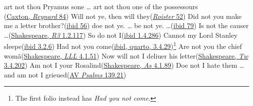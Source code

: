 \ea \label{ex:11-02}
\ea
art not thou Pryamus sone {\dots} art not thou one of the possessours\\\hfill(\href{https://archive.org/details/TheHistoryOfReynardTheFoxArber/page/n113/mode/2up?q=%22thou+Pryamus+sone%22&view=theater}{Caxton, \textit{Reynard} 84})
\ex
Will not ye, then will they\hfill(\href{https://archive.org/details/roisterdoister00udalgoog/page/n58/mode/2up?view=theater&q=%22will+not+ye%22}{\textit{Roister} 52})
\ex
Did not you make me a letter brother?\hfill(\href{https://archive.org/details/roisterdoister00udalgoog/page/n62/mode/2up?view=theater&q=%22make+me+a+letter%22}{ibid 56}) %
\ex
doe not ye. {\dots} be not ye. {\dots}\hfill(\href{https://archive.org/details/roisterdoister00udalgoog/page/n84/mode/2up?view=theater&q=%22doe+not+ye%22}{ibid 79})
\ex
Is not the causer {\dots}\hfill(\href{https://internetshakespeare.uvic.ca/doc/R3_F1/scene/1.2/index.html#tln-300}{Shakespeare, \textit{R3} 1.2.117})
\ex
So do not I\hfill(\href{https://internetshakespeare.uvic.ca/doc/R3_F1/scene/1.4/index.html#tln-1110}{ibid 1.4.286})
\ex
Cannot my Lord Stanley sleepe\hfill(\href{https://internetshakespeare.uvic.ca/doc/R3_F1/scene/3.2/index.html#tln-1800}{ibid 3.2.6}) %
\ex
Had not you come\hfill(\href{https://internetshakespeare.uvic.ca/doc/R3_Q1/complete/index.html#tln-1990}{ibid, quarto, 3.4.29})\footnote{The first folio instead has \textit{Had you not come}. \eds} %
\ex
Are not you the chief womã\hfill(\href{https://internetshakespeare.uvic.ca/doc/LLL_F1/scene/4.1/index.html#tln-1025}{Shakespeare, \textit{LLL} 4.1.51}) %
\ex
Now will not I deliuer his letter\hfill(\href{https://internetshakespeare.uvic.ca/doc/TN_F1/scene/3.4/index.html#tln-1700}{Shakespeare, \textit{Tw} 3.4.202}) 
\ex
Am not I your Rosalind\hfill(\href{https://internetshakespeare.uvic.ca/doc/AYL_F1/scene/4.1/index.html#tln-2000}{Shakespeare, \textit{As} 4.1.89})
\ex
Doe not I hate them {\dots} and am not I grieued\hfill(\href{https://www.kingjamesbibleonline.org/1611_Psalms-139-21/}{AV \textit{Psalms} 139.21})
